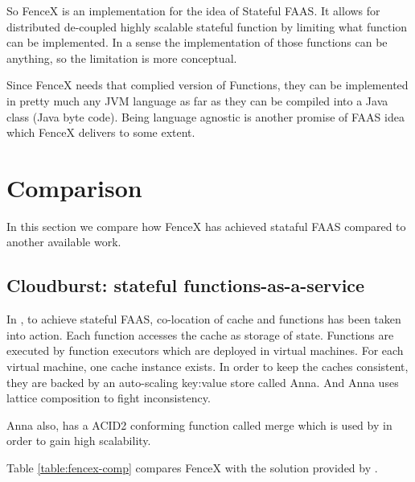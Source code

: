 \documentclass[a4]{report}
\begin{document}
    So FenceX is an implementation for the idea of Stateful FAAS.
    It allows for distributed de-coupled highly scalable stateful function by limiting what function can be implemented.
    In a sense the implementation of those functions can be anything, so the limitation is more conceptual.

    Since FenceX needs that complied version of Functions, they can be implemented in pretty much any JVM language as
    far as they can be compiled into a Java class (Java byte code).
    Being language agnostic is another promise of FAAS idea which FenceX delivers to some extent.


    \section{Comparison}
    In this section we compare how FenceX has achieved stataful FAAS compared to another available work.

    \subsection{Cloudburst: stateful functions-as-a-service}
    In \cite{Functions-as-a-Service-2020}, to achieve stateful FAAS, co-location of cache and functions has been
    taken into action.
    Each function accesses the cache as storage of state.
    Functions are executed by function executors which are deployed in virtual machines.
    For each virtual machine, one cache instance exists.
    In order to keep the caches consistent, they are backed by an auto-scaling key:value store called Anna.
    And Anna uses lattice composition to fight inconsistency.

    Anna also, has a ACID2 conforming function called merge which is used by \cite{Functions-as-a-Service-2020} in
    order to gain high scalability.

    Table \ref{table:fencex-comp} compares FenceX with the solution provided by \cite{Functions-as-a-Service-2020}.
\end{document}
